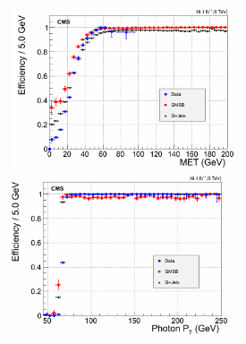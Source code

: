 \vspace{5mm}
\begin{minipage}{0.90\linewidth} 
\begin{center}
\mbox{
\includegraphics[height=0.45\textwidth, width=0.5\textwidth]{THESISPLOTS/PFMET_EffAsym.png}
\includegraphics[height=0.45\textwidth, width=0.5\textwidth]{THESISPLOTS/Photon_EffAsym.png}}
\label{fig:HLTEff}
\end{center}
\end{minipage}
